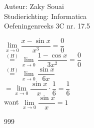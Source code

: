 \documentclass[a4paper]{article}
\begin{document}
  
\noindent \large Auteur: Zaky Souai \\
\noindent \large Studierichting:  Informatica\\
\noindent \large Oefeningenreeks 3C nr. 17.5\\

\bigskip

\normalsize

$\lim\limits_{x \to 0} \dfrac{x - \sin x}{x^3} = \dfrac{0}{0}$ \\
 
$\overset{(H)}{=} \lim\limits_{x \to 0} \dfrac{1 - \cos x}{3x^2} = \dfrac{0}{0}$ \\

$\overset{(H)}{=} \lim\limits_{x \to 0} \dfrac{\sin x}{6x}$ \\

$= \lim\limits_{x \to 0} \dfrac{\sin x}{x} \cdot \dfrac{1}{6} = \dfrac{1}{6}$ \\

want $\lim\limits_{x \to 0} \dfrac{\sin x}{x} = 1$ 


\begin{thebibliography}{999}
\end{thebibliography}
\end{document}
